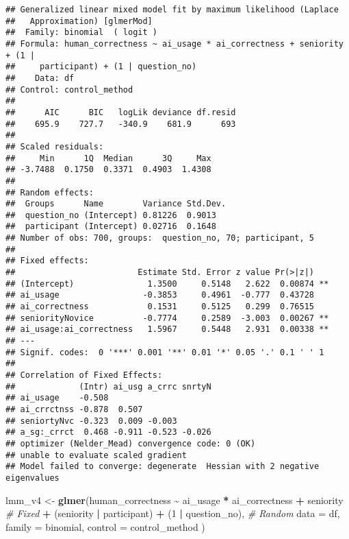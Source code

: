 \documentclass[
]{article}
\newenvironment{Shaded}{\begin{snugshade}}{\end{snugshade}}
\newcommand{\AttributeTok}[1]{\textcolor[rgb]{0.13,0.29,0.53}{#1}}
\newcommand{\CommentTok}[1]{\textcolor[rgb]{0.56,0.35,0.01}{\textit{#1}}}
\newcommand{\DecValTok}[1]{\textcolor[rgb]{0.00,0.00,0.81}{#1}}
\newcommand{\FunctionTok}[1]{\textcolor[rgb]{0.13,0.29,0.53}{\textbf{#1}}}
\newcommand{\NormalTok}[1]{#1}
\newcommand{\OtherTok}[1]{\textcolor[rgb]{0.56,0.35,0.01}{#1}}
\newcommand{\SpecialCharTok}[1]{\textcolor[rgb]{0.81,0.36,0.00}{\textbf{#1}}}
\begin{document}
\begin{verbatim}
## Generalized linear mixed model fit by maximum likelihood (Laplace
##   Approximation) [glmerMod]
##  Family: binomial  ( logit )
## Formula: human_correctness ~ ai_usage * ai_correctness + seniority + (1 |  
##     participant) + (1 | question_no)
##    Data: df
## Control: control_method
## 
##      AIC      BIC   logLik deviance df.resid 
##    695.9    727.7   -340.9    681.9      693 
## 
## Scaled residuals: 
##     Min      1Q  Median      3Q     Max 
## -3.7488  0.1750  0.3371  0.4903  1.4308 
## 
## Random effects:
##  Groups      Name        Variance Std.Dev.
##  question_no (Intercept) 0.81226  0.9013  
##  participant (Intercept) 0.02716  0.1648  
## Number of obs: 700, groups:  question_no, 70; participant, 5
## 
## Fixed effects:
##                         Estimate Std. Error z value Pr(>|z|)   
## (Intercept)               1.3500     0.5148   2.622  0.00874 **
## ai_usage                 -0.3853     0.4961  -0.777  0.43728   
## ai_correctness            0.1531     0.5125   0.299  0.76515   
## seniorityNovice          -0.7774     0.2589  -3.003  0.00267 **
## ai_usage:ai_correctness   1.5967     0.5448   2.931  0.00338 **
## ---
## Signif. codes:  0 '***' 0.001 '**' 0.01 '*' 0.05 '.' 0.1 ' ' 1
## 
## Correlation of Fixed Effects:
##             (Intr) ai_usg a_crrc snrtyN
## ai_usage    -0.508                     
## ai_crrctnss -0.878  0.507              
## seniortyNvc -0.323  0.009 -0.003       
## a_sg:_crrct  0.468 -0.911 -0.523 -0.026
## optimizer (Nelder_Mead) convergence code: 0 (OK)
## unable to evaluate scaled gradient
## Model failed to converge: degenerate  Hessian with 2 negative eigenvalues
\end{verbatim}

\begin{Shaded}
\begin{Highlighting}[]
\NormalTok{lmm\_v4 }\OtherTok{\textless{}{-}} \FunctionTok{glmer}\NormalTok{(human\_correctness }\SpecialCharTok{\textasciitilde{}}\NormalTok{ ai\_usage }\SpecialCharTok{*}\NormalTok{ ai\_correctness }\SpecialCharTok{+}\NormalTok{ seniority }\CommentTok{\# Fixed}
                \SpecialCharTok{+}\NormalTok{ (seniority }\SpecialCharTok{|}\NormalTok{ participant) }\SpecialCharTok{+}\NormalTok{ (}\DecValTok{1} \SpecialCharTok{|}\NormalTok{ question\_no), }\CommentTok{\# Random}
                \AttributeTok{data =}\NormalTok{ df, }\AttributeTok{family =}\NormalTok{ binomial,}
                \AttributeTok{control =}\NormalTok{ control\_method}
\NormalTok{                )}
\end{Highlighting}
\end{Shaded}
\end{document}
